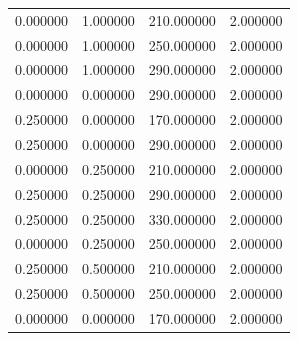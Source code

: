 \documentclass[12pt]{report}
\begin{document}
\begin{center}
\begin{table}[h!]
\begin{center}
\begin{tabular}{|llll|}
				0.000000                                              & 1.000000                   & 210.000000                & 2.000000 \\
				0.000000                                              & 1.000000                   & 250.000000                & 2.000000 \\
				0.000000                                              & 1.000000                   & 290.000000                & 2.000000 \\
				0.000000                                              & 0.000000                   & 290.000000                & 2.000000 \\
				0.250000                                              & 0.000000                   & 170.000000                & 2.000000 \\
				0.250000                      & 0.000000                   & 290.000000                & 2.000000 \\
				0.000000                      & 0.250000                   & 210.000000                & 2.000000 \\
				0.250000                      & 0.250000                   & 290.000000                & 2.000000 \\
				0.250000                      & 0.250000                   & 330.000000                & 2.000000 \\
				0.000000                      & 0.250000                   & 250.000000                & 2.000000 \\
				0.250000                      & 0.500000                   & 210.000000                & 2.000000 \\
				0.250000                      & 0.500000                   & 250.000000                & 2.000000 \\
				0.000000                                              & 0.000000                   & 170.000000                & 2.000000 \\ \hline
			\end{tabular}
		\end{center}
	\end{table}
	
\end{center}

\newpage
\end{document}
